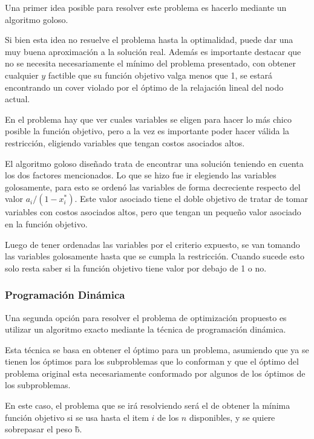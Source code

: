 Una primer idea posible para resolver este problema es hacerlo mediante un algoritmo goloso.

Si bien esta idea no resuelve el problema hasta la optimalidad, puede dar una muy buena aproximaci\'on a la soluci\'on real. Adem\'as es importante destacar que no se necesita necesariamente el m\'inimo del problema presentado, con obtener cualquier $y$ factible que su funci\'on objetivo valga menos que 1, se estar\'a encontrando un cover violado por el \'optimo de la relajaci\'on lineal del nodo actual.


En el problema hay que ver cuales variables se eligen para hacer lo m\'as chico posible la funci\'on objetivo, pero a la vez es importante poder hacer v\'alida la restricci\'on, eligiendo variables que tengan costos asociados altos.

El algoritmo goloso dise\~nado trata de encontrar una soluci\'on teniendo en cuenta los dos factores mencionados. Lo que se hizo fue ir elegiendo las variables golosamente, para esto se orden\'o las variables de forma decreciente respecto del valor $a_i / (1-x_i^*)$. Este valor asociado tiene el doble objetivo de tratar de tomar variables con costos asociados altos, pero que tengan un peque\~no valor asociado en la funci\'on objetivo.

Luego de tener ordenadas las variables por el criterio expuesto, se van tomando las variables golosamente hasta que se cumpla la restricci\'on. Cuando sucede esto solo resta saber si la funci\'on objetivo tiene valor por debajo de 1 o no.





\medskip
\subsubsection{Programaci\'on Din\'amica}

Una segunda opci\'on para resolver el problema de optimizaci\'on propuesto es utilizar un algoritmo exacto mediante la t\'ecnica de programaci\'on din\'amica.

Esta t\'ecnica se basa en obtener el \'optimo para un problema, asumiendo que ya se tienen los \'optimos para los subproblemas que lo conforman y que el \'optimo del problema original esta necesariamente conformado por algunos de los \'optimos de los subproblemas.


En este caso, el problema que se ir\'a resolviendo ser\'a el de obtener la m\'inima funci\'on objetivo si se usa hasta el item $i$ de los $n$ disponibles, y se quiere sobrepasar el peso \~b.

